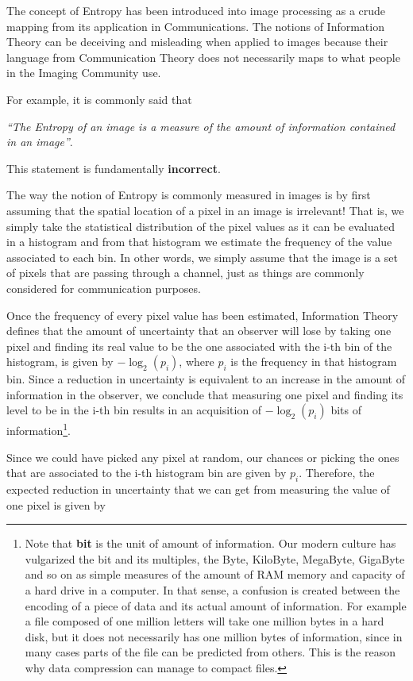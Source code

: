The concept of Entropy has been introduced into image processing as a crude
mapping from its application in Communications. The notions of Information
Theory can be deceiving and misleading when applied to images because their
language from Communication Theory does not necessarily maps to what people in
the Imaging Community use.

For example, it is commonly said that

\emph{``The Entropy of an image is a measure of the amount of information
contained in an image''}.

This statement is fundamentally \textbf{incorrect}.

The way the notion of Entropy is commonly measured in images is by first
assuming that the spatial location of a pixel in an image is irrelevant!  That
is, we simply take the statistical distribution of the pixel values as it can
be evaluated in a histogram and from that histogram we estimate the frequency
of the value associated to each bin. In other words, we simply assume that the
image is a set of pixels that are passing through a channel, just as things are
commonly considered for communication purposes.

Once the frequency of every pixel value has been estimated, Information Theory
defines that the amount of uncertainty that an observer will lose by taking one
pixel and finding its real value to be the one associated with the i-th bin of the
histogram, is given by $-\log_2{(p_i)}$, where $p_i$ is the frequency in that
histogram bin. Since a reduction in uncertainty is equivalent to an increase in
the amount of information in the observer, we conclude that measuring one pixel
and finding its level to be in the i-th bin results in an acquisition of
$-\log_2{(p_i)}$ bits of information\footnote{Note that \textbf{bit} is the unit of
amount of information. Our modern culture has vulgarized the bit and its
multiples, the Byte, KiloByte, MegaByte, GigaByte and so on as simple measures
of the amount of RAM memory and capacity of a hard drive in a computer. In that
sense, a confusion is created between the encoding of a piece of data and its
actual amount of information. For example a file composed of one million
letters will take one million bytes in a hard disk, but it does not necessarily
has one million bytes of information, since in many cases parts of the file can
be predicted from others. This is the reason why data compression can manage to
compact files.}.

Since we could have picked any pixel at random, our chances or picking the ones
that are associated to the i-th histogram bin are given by $p_i$. Therefore,
the expected reduction in uncertainty that we can get from measuring the value
of one pixel is given by

